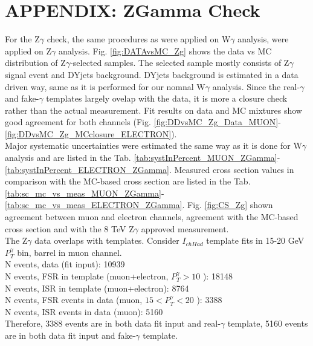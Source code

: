 \section{APPENDIX: ZGamma Check}
\label{sec:ZgCheck}

For the Z$\gamma$ check, the same procedures as were applied on W$\gamma$ analysis, were applied on Z$\gamma$ analysis. Fig. \ref{fig:DATAvsMC_Zg} shows the data vs MC distribution of Z$\gamma$-selected samples. The selected sample mostly consists of Z$\gamma$ signal event and DYjets background. DYjets background is estimated in a data driven way, same as it is performed for our nomnal W$\gamma$ analysis.  Since the real-$\gamma$ and fake-$\gamma$ templates largely ovelap with the data, it is more a closure check rather than the actual measurement. Fit results on data and MC mixtures show good agreement for both channels (Fig. \ref{fig:DDvsMC_Zg_Data_MUON}-\ref{fig:DDvsMC_Zg_MCclosure_ELECTRON}).\\
Major systematic uncertainties were estimated the same way as it is done for W$\gamma$ analysis and are listed in the Tab. \ref{tab:systInPercent_MUON_ZGamma}-\ref{tab:systInPercent_ELECTRON_ZGamma}. Measured cross section values in comparison with the MC-based cross section are listed in the Tab. \ref{tab:sc_mc_vs_meas_MUON_ZGamma}-\ref{tab:sc_mc_vs_meas_ELECTRON_ZGamma}. Fig. \ref{fig:CS_Zg} shown agreement between muon and electron channels, agreement with the MC-based cross section and with the 8 TeV Z$\gamma$ approved measurement.\\

The Z$\gamma$ data overlaps with templates. Consider $I_{chHad}$ template fits in 15-20 GeV $P_T^{\gamma}$ bin, barrel in muon channel.\\
N events, data (fit input): 10939\\
N events, FSR in template (muon+electron, $P_T^{\gamma}>10$ ): 18148\\
N events, ISR in template (muon+electron): 8764\\
N events, FSR events in data (muon, $15<P_T^{\gamma}<20$ ): 3388\\
N events, ISR events in data (muon): 5160\\
Therefore, 3388 events are in both data fit input and real-$\gamma$ template, 5160 events are in both data fit input and fake-$\gamma$ template.\\



